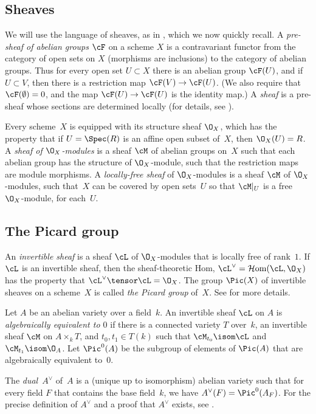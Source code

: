 \documentclass{report}
\begin{document}
\subsection{Sheaves}
We will use the language of sheaves, as in \cite{hartshorne},
which we now quickly recall.  A {\em pre-sheaf of abelian groups}
$\cF$ on a scheme $X$ is a contravariant functor from the category
of open sets on $X$ (morphisms are inclusions) to the category of
abelian groups. Thus for every open set $U\subset X$ there is an
abelian group $\cF(U)$, and if $U\subset V$, then there is a
restriction map $\cF(V)\to \cF(U)$. (We also require that
$\cF(\emptyset)=0$, and the map $\cF(U)\to \cF(U)$ is the identity
map.)  A {\em sheaf} is a pre-sheaf whose sections are determined
locally (for details, see \cite[\S{}II.1]{hartshorne}).

Every scheme~$X$ is equipped with its structure sheaf $\O_X$,
which has the property that if $U=\Spec(R)$ is an affine open
subset of~$X$, then $\O_X(U)=R$.  A {\em sheaf of $\O_X$-modules}
is a sheaf $\cM$ of abelian groups on~$X$ such that each abelian
group has the structure of $\O_X$-module, such that the
restriction maps are module morphisms.  A {\em locally-free sheaf}
of $\O_X$-modules is a sheaf $\cM$ of $\O_X$-modules, such
that~$X$ can be covered by open sets~$U$ so that $\cM|_U$ is a
free $\O_X$-module, for each~$U$.


\subsection{The Picard group}
An {\em invertible sheaf} is a sheaf $\cL$ of $\O_X$-modules that
is locally free of rank~$1$.  If $\cL$ is an invertible sheaf,
then the sheaf-theoretic Hom, $\cL^{\vee}=\mathcal{H}{\rm
om}(\cL,\O_X)$ has the property that $\cL^{\vee}\tensor\cL =
\O_X$. The group $\Pic(X)$ of invertible sheaves on a scheme~$X$
is called {\em the Picard group} of~$X$. See
\cite[\S{}II.6]{hartshorne} for more details.

Let $A$ be an abelian variety over a field~$k$.  An invertible
sheaf $\cL$ on $A$ is {\em algebraically equivalent to $0$} if
there is a connected variety $T$ over~$k$, an invertible sheaf
$\cM$ on $A\times_k T$, and $t_0,t_1\in T(k)$ such that
$\cM_{t_0}\isom \cL$ and $\cM_{t_1}\isom \O_A$.
 Let $\Pic^0(A)$ be
the subgroup of elements of $\Pic(A)$ that are algebraically
equivalent to~$0$.

The {\em dual}~$A^{\vee}$ of~$A$ is a (unique up to isomorphism)
abelian variety such that for every field $F$ that contains the
base field~$k$, we have $A^{\vee}(F)=\Pic^0(A_F)$.  For the
precise definition of $A^{\vee}$ and a proof that $A^{\vee}$
exists, see \cite[\S 9--10]{milne:abvars}.
\end{document}
